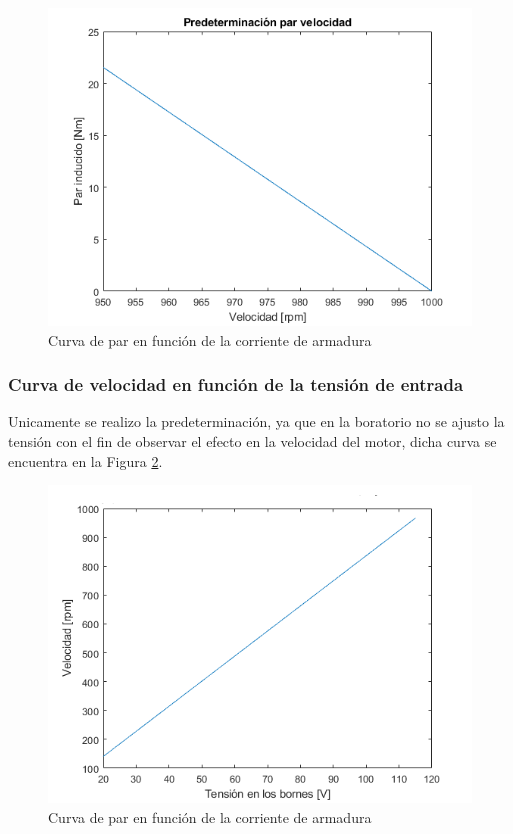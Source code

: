 \documentclass[11pt,letterpaper]{article}     %
\begin{document}
\begin{figure}[H]
	\centering
	\includegraphics[scale=0.8]{./recursos-Lab6/curvaPredeterminarParVelocidad.png}
	\caption{Curva de par en función de la corriente de armadura}
	\label{fig:CurvapredeterminadaDeParVelocidad}
\end{figure}
\subsubsection{Curva de velocidad en función de la tensión de entrada}
Unicamente se realizo la predeterminación, ya que en la boratorio no se ajusto la tensión con el fin de observar el efecto en la velocidad del motor, dicha curva se encuentra en la Figura \ref{fig:curvaPredeterminadaVelocidadTension}.
\begin{figure}[H]
	\centering
	\includegraphics[scale=0.8]{./recursos-Lab6/curvaPredeterminarVelocidadTension.png}
	\caption{Curva de par en función de la corriente de armadura}
	\label{fig:curvaPredeterminadaVelocidadTension}
\end{figure}
\end{document}
